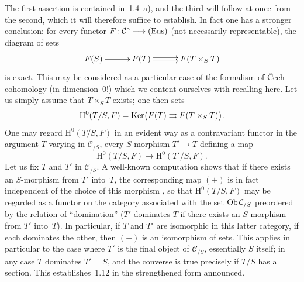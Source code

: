 The first assertion is contained in~1.4~a), and the third will follow at
once from the second, which it will therefore suffice to establish. In fact
one has a stronger conclusion: for every functor
\(F\colon\mathcal{C}^{\circ}\longrightarrow\textup{(Ens)}\) (not necessarily representable), the
diagram of sets
\[
\xymatrix@C=3em{
F(S) \ar[r]
  & F(T) \ar@<0.5ex>[r] \ar@<-0.5ex>[r]
  & F(T\times_{S}T)
}
\]
is exact. This may be considered as a particular case of the formalism of
\v{C}ech cohomology (in dimension~0!) which we content ourselves with
recalling here. Let us simply assume that \(T\times_{S}T\) exists; one then
sets
\[
\mathrm{H}^{0}(T/S,F)
=\operatorname{Ker}\bigl(F(T)\rightrightarrows F(T\times_{S}T)\bigr).
\]
One may regard \(\mathrm{H}^{0}(T/S,F)\) in an evident way as a
contravariant functor in the argument \(T\) varying in \(\mathcal{C}_{/S}\),
every \(S\)-morphism \(T'\to T\) defining a map
\begin{equation}
\mathrm{H}^{0}(T/S,F)\longrightarrow\mathrm{H}^{0}(T'/S,F).
\tag{+}
\end{equation}
Let us fix \(T\) and \(T'\) in \(\mathcal{C}_{/S}\). A well-known computation
shows that if there exists an \(S\)-morphism from \(T'\) into~\(T\), the
corresponding map \((+)\) is in fact independent of the choice of this
morphism%
{\renewcommand{\thefootnote}{(6)}},
so that \(\mathrm{H}^{0}(T/S,F)\) may be regarded as a functor on the
category associated with the set \(\operatorname{Ob}\mathcal{C}_{/S}\) preordered by the
relation of ``domination'' (\(T'\) dominates \(T\) if there exists an
\(S\)-morphism from \(T'\) into~\(T\)). In particular, if \(T\) and \(T'\) are
isomorphic in this latter category, \ie if each dominates the other, then
\((+)\) is an isomorphism of sets. This applies in particular to the case
where \(T'\) is the final object of \(\mathcal{C}_{/S}\), \ie essentially
\(S\) itself; in any case \(T\) dominates \(T'=S\), and the converse is true
precisely if \(T/S\) has a section. This establishes~1.12 in the strengthened
form announced.

